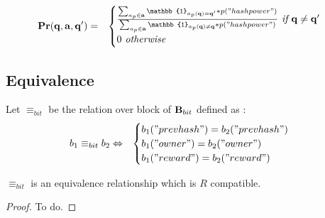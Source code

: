


\begin{eqnarray*}
	\pr(\bq, \ba, \bq') & = &
	\begin{cases}
		\frac{\sum_{a_p \in \ba} \mathbb{1}_{a_p(\bq) = \bq'}*p("hashpower")}{\sum_{a_p \in \ba} \mathbb{1}_{a_p(\bq) \neq \bq}*p("hashpower")} \textit{ if }  \bq \neq \bq' \\
		0 \textit{ otherwise } 
	\end{cases}\\
\end{eqnarray*}

\subsection{Equivalence}

\begin{mydef}
	Let $\equiv_{bit}$ be the relation over block of $\text{\bf B}_{bit}$ defined as : 
	\begin{eqnarray*}
		b_1 \equiv_{bit} b_2 & \Leftrightarrow &
		\begin{cases}
			b_1("prevhash") = b_2("prevhash") \\
			b_1("owner") = b_2("owner") \\
			b_1("reward") = b_2("reward")
		\end{cases}\\
	\end{eqnarray*}
\end{mydef}

\begin{myprop}
	$\equiv_{bit}$ is an equivalence relationship which is $R$ compatible. 
\end{myprop}

\begin{proof}
	To do.
\end{proof}

